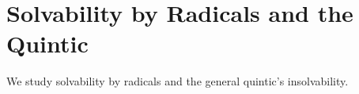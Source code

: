 \section{Solvability by Radicals and the Quintic}
\label{sec:solvability-radicals-quintic}

We study solvability by radicals and the general quintic's insolvability.
